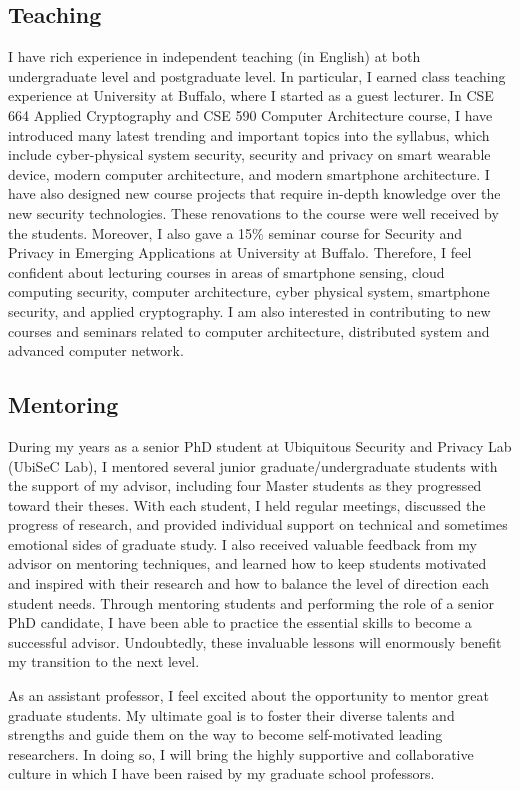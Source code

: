 \documentclass[11pt]{article}
\begin{document}
\subsection*{Teaching} 
 I have rich experience in independent teaching (in English) at both undergraduate level and postgraduate level. In particular, I earned class teaching experience at University at Buffalo, where I started as a guest lecturer. In CSE 664 Applied Cryptography and CSE 590 Computer Architecture course, I have introduced many latest trending and important topics into the syllabus, which include cyber-physical system security, security and privacy on smart wearable device, modern computer architecture, and modern smartphone architecture. I have also designed new course projects that require in-depth knowledge over the new security technologies. These renovations to the course were well received by the students. Moreover, I also gave a 15\% seminar course for Security and Privacy in Emerging Applications at University at Buffalo. Therefore, I feel confident about lecturing courses in areas of smartphone sensing, cloud computing security, computer architecture, cyber physical system, smartphone security, and applied cryptography. I am also interested in contributing to new courses and seminars related to computer architecture, distributed system and advanced computer network. 
\subsection*{Mentoring}
 During my years as a senior PhD student at Ubiquitous Security and Privacy Lab (UbiSeC Lab), I mentored several junior graduate/undergraduate students with the support of my advisor, including four Master students as they progressed toward their theses. With each student, I held regular meetings, discussed the progress of research, and provided individual support on technical and sometimes emotional sides of graduate study. I also received valuable feedback from my advisor on mentoring techniques, and learned how to keep students motivated and inspired with their research and how to balance the level of direction each student needs. Through mentoring students and performing the role of a senior PhD candidate, I have been able to practice the essential skills to become a successful advisor. Undoubtedly, these invaluable lessons will enormously benefit my transition to the next level. 

As an assistant professor, I feel excited about the opportunity to mentor great graduate students. My ultimate goal is to foster their diverse talents and strengths and guide them on the way to become self-motivated leading researchers. In doing so, I will bring the highly supportive and collaborative culture in which I have been raised by my graduate school professors.
\end{document}
